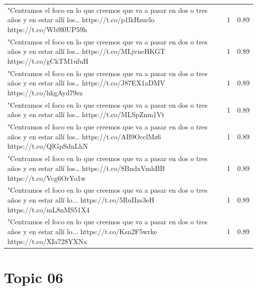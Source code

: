 \begin{longtable}{p{12.5cm}rr}
"Centramos el foco en lo que creemos que va a pasar en dos o tres años y en estar allí los… https://t.co/p1lkHzuclo https://t.co/Wb9l0UP59h & 1 & 0.89 \\
"Centramos el foco en lo que creemos que va a pasar en dos o tres años y en estar allí los… https://t.co/MLjvneHKGT https://t.co/gCkTM1ufuH & 1 & 0.89 \\
"Centramos el foco en lo que creemos que va a pasar en dos o tres años y en estar allí los… https://t.co/J87EX1aDMV https://t.co/hkgAyd79ez & 1 & 0.89 \\
"Centramos el foco en lo que creemos que va a pasar en dos o tres años y en estar allí los… https://t.co/MLSpZnm1Vt & 1 & 0.89 \\
"Centramos el foco en lo que creemos que va a pasar en dos o tres años y en estar allí los… https://t.co/AB9OcclMz6 https://t.co/QlGpSdnLhN & 1 & 0.89 \\
"Centramos el foco en lo que creemos que va a pasar en dos o tres años y en estar allí los… https://t.co/8BndxVmhBB https://t.co/Vcg6OrYo1w & 1 & 0.89 \\
"Centramos el foco en lo que creemos que va a pasar en dos o tres años y en estar allí lo... https://t.co/5RuIIzs3eH https://t.co/mL8nMS51X4 & 1 & 0.89 \\
"Centramos el foco en lo que creemos que va a pasar en dos o tres años y en estar allí lo... https://t.co/Ksn2F5wrke https://t.co/XIa728YXNx & 1 & 0.89 \\

\end{longtable}
\clearpage

\section{Topic 06}

